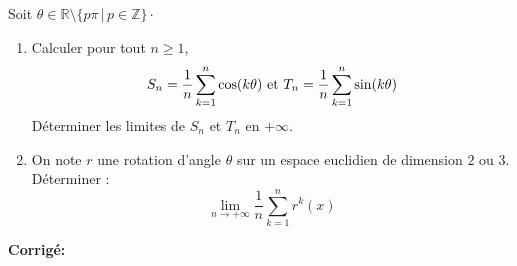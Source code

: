 \documentclass[a4paper,twoside,french,11pt]{VcCours}
\newcommand{\corr}{\textbf{Corrigé:}}
\begin{document}
\begin{Exercice}{} Soit $\theta \in \mathbb{R} \setminus \lbrace p \pi \, \vert \, p \in \mathbb{Z} \rbrace \cdot$
\begin{enumerate}
\item Calculer pour tout $n \geq 1$,
$$ S_n = \dfrac{1}{n} \sum_{k=1}^n \cos(k \theta) \hbox{ et } T_n =\dfrac{1}{n} \sum_{k=1}^n \sin(k \theta)$$
Déterminer les limites de $S_n$ et $T_n$ en $+ \infty$.
\item On note $r$ une rotation d'angle $\theta$ sur un espace euclidien de dimension $2$ ou $3$. Déterminer :
$$ \lim_{n \rightarrow + \infty} \dfrac{1}{n} \sum_{k=1}^n r^k(x)$$
\end{enumerate}
\end{Exercice}

\newpage

\corr
\end{document}
